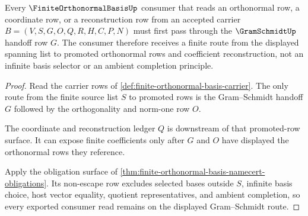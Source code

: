 \begin{theorem}
\label{thm:finite-orthonormal-basis-gram-schmidt-handoff}
Every $\FiniteOrthonormalBasisUp$ consumer that reads an orthonormal row, a coordinate row, or a reconstruction row from an accepted carrier $B=(V,S,G,O,Q,R,H,C,P,N)$ must first pass through the $\GramSchmidtUp$ handoff row $G$. The consumer therefore receives a finite route from the displayed spanning list to promoted orthonormal rows and coefficient reconstruction, not an infinite basis selector or an ambient completion principle.
\end{theorem}
\begin{proof}
Read the carrier rows of \autoref{def:finite-orthonormal-basis-carrier}. The only route from the finite source list $S$ to promoted rows is the Gram--Schmidt handoff $G$ followed by the orthogonality and norm-one row $O$.

The coordinate and reconstruction ledger $Q$ is downstream of that promoted-row surface. It can expose finite coefficients only after $G$ and $O$ have displayed the orthonormal rows they reference.

Apply the obligation surface of \autoref{thm:finite-orthonormal-basis-namecert-obligations}. Its non-escape row excludes selected bases outside $S$, infinite basis choice, host vector equality, quotient representatives, and ambient completion, so every exported consumer read remains on the displayed Gram--Schmidt route.
\end{proof}


\begin{closurestatus}{\FiniteOrthonormalBasisUp}
  \theoryclosure{\seedClosure}
  \formalstatus{\unformalizedV}
\end{closurestatus}
